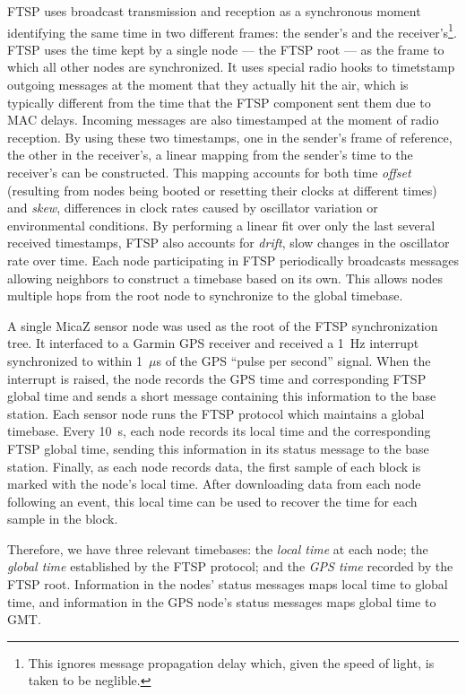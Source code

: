 FTSP uses broadcast transmission and reception as a synchronous moment
identifying the same time in two different frames: the sender's and the
receiver's\footnote{This ignores message propagation delay which, given the
speed of light, is taken to be neglible.}. FTSP uses the time kept by a
single node --- the FTSP root --- as the frame to which all other nodes are
synchronized. It uses special radio hooks to timetstamp outgoing messages at
the moment that they actually hit the air, which is typically different from
the time that the FTSP component sent them due to MAC delays. Incoming
messages are also timestamped at the moment of radio reception. By using
these two timestamps, one in the sender's frame of reference, the other in
the receiver's, a linear mapping from the sender's time to the receiver's can
be constructed. This mapping accounts for both time \textit{offset}
(resulting from nodes being booted or resetting their clocks at different
times) and \textit{skew}, differences in clock rates caused by oscillator
variation or environmental conditions. By performing a linear fit over only
the last several received timestamps, FTSP also accounts for \textit{drift},
slow changes in the oscillator rate over time. Each node participating in
FTSP periodically broadcasts messages allowing neighbors to construct a
timebase based on its own. This allows nodes multiple hops from the root node
to synchronize to the global timebase.

A single MicaZ sensor node was used as the root of the FTSP synchronization
tree. It interfaced to a Garmin GPS receiver and received a 1~Hz interrupt
synchronized to within 1~$\mu$s of the GPS ``pulse per second'' signal.
When the interrupt is raised, the node records the GPS time and corresponding
FTSP global time and sends a short message containing this information to the
base station. Each sensor node runs the FTSP protocol which maintains a
global timebase. Every 10~s, each node records its local time and the
corresponding FTSP global time, sending this information in its status
message to the base station. Finally, as each node records data, the first
sample of each block is marked with the node's local time. After downloading
data from each node following an event, this local time can be used to
recover the time for each sample in the block.

Therefore, we have three relevant timebases: the \textit{local time} at each
node; the \textit{global time} established by the FTSP protocol; and the
\textit{GPS time} recorded by the FTSP root. Information in the nodes' status
messages maps local time to global time, and information in the GPS node's
status messages maps global time to GMT.

